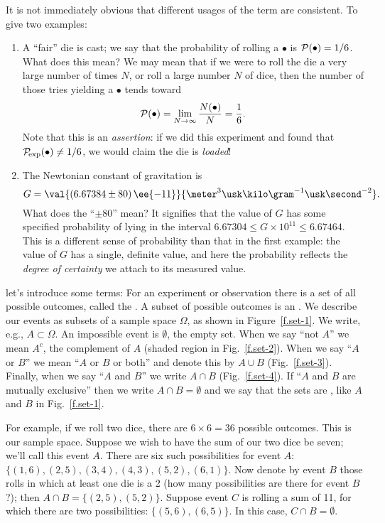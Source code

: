 It is not immediately obvious that different usages of the term are consistent. To give two examples:

\begin{enumerate}
\item A ``fair'' die is cast; we say that the probability of rolling a $\bullet$ is $\mathcal{P}(\bullet) = 1/6$.  What does this mean?  We may mean that if we were to roll the die a very large number of times $N$, or roll a large number $N$ of dice, then the number of those tries yielding a $\bullet$ tends toward
\[ \mathcal{P}(\bullet) = \lim_{N\to\infty} \frac{N(\bullet)}{N} = \frac{1}{6}. \]
Note that this is an \emph{assertion}: if we did this experiment and found that $\mathcal{P}_{\!\mathrm{exp}}(\bullet) \neq 1/6$, we would claim the die is \emph{loaded}!

\item The Newtonian constant of gravitation is
\[ G = \val{\left(6.67384\pm80\right)\ee{-11}}{\meter^{3}\usk\kilo\gram^{-1}\usk\second^{-2}}. \]
What does the ``$\pm80$'' mean? It signifies that the value of $G$ has some specified probability of lying in the interval $6.67304\leq G\times 10^{11} \leq 6.67464$.
This is a different sense of probability than that in the first example: the value of $G$ has a single, definite value, and here the probability reflects the \emph{degree of certainty} we attach to its measured value.
\end{enumerate}

 let's introduce some terms\cite{Durrett1994The-Essentials-}:
For an experiment or observation there is a set of all possible outcomes, called the 
. A subset of possible outcomes is an .
We describe our events as subsets of a sample space $\Omega$, as shown in Figure~\ref{f.set-1}.  We write, e.g., $A \subset \Omega$. An impossible event is $\emptyset$, the empty set.  When we say ``not $A$'' we mean $A^{c}$,  the complement of $A$ (shaded region in Fig.~\ref{f.set-2}).
When we say ``$A$ or $B$'' we mean ``$A$ or $B$ or both'' and denote this by $A\cup B$ (Fig.~\ref{f.set-3}).
Finally, when we say ``$A$ and $B$'' we write $A\cap B$ (Fig.~\ref{f.set-4}).  If ``$A$ and $B$ are mutually exclusive'' then we write $A\cap B =\emptyset$ and we say that the sets are 
, like $A$ and $B$ in Fig.~\ref{f.set-1}.

For example, if we roll two dice, there are $6\times 6 = 36$ possible outcomes. This is our sample space. Suppose we wish to have the sum of our two dice be seven; we'll call this event $A$. There are six such possibilities for event $A$: $\{(1,6),(2,5),(3,4),(4,3),(5,2),(6,1)\}$. Now denote by event $B$ those rolls in which at least one die is a 2 (how many possibilities are there for event $B$?); then $A\cap B = \{(2,5),(5,2)\}$. Suppose event $C$ is rolling a sum of 11, for which there are two possibilities: $\{(5,6),(6,5)\}$. In this case, $C\cap B = \emptyset$.

